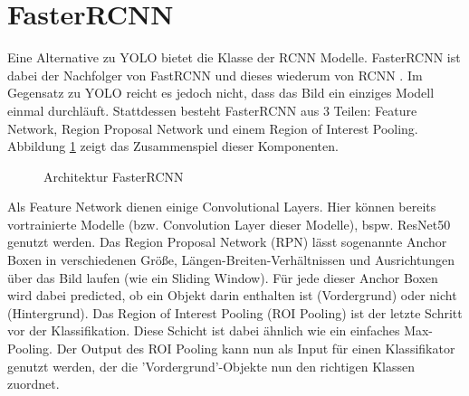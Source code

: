 \section{FasterRCNN}
Eine Alternative zu YOLO bietet die Klasse der RCNN Modelle.
FasterRCNN ist dabei der Nachfolger von FastRCNN und dieses wiederum von RCNN \cite{fasterrcnn}.
Im Gegensatz zu YOLO reicht es jedoch nicht, dass das Bild ein einziges Modell einmal durchläuft.
Stattdessen besteht FasterRCNN aus 3 Teilen: Feature Network, Region Proposal Network und einem Region of Interest Pooling. 
Abbildung \ref{fig:fasterrcnn} zeigt das Zusammenspiel dieser Komponenten. \\
\begin{figure}[!htb]
    \centering
    \caption{Architektur FasterRCNN \cite{fasterrcnn} }
    \label{fig:fasterrcnn}
\end{figure} 
Als Feature Network dienen einige Convolutional Layers. 
Hier können bereits vortrainierte Modelle (bzw. Convolution Layer dieser Modelle), bspw. ResNet50 genutzt werden.
Das Region Proposal Network (RPN) lässt sogenannte Anchor Boxen in verschiedenen Größe, Längen-Breiten-Verhältnissen und Ausrichtungen über das Bild laufen (wie ein Sliding Window).
Für jede dieser Anchor Boxen wird dabei predicted, ob ein Objekt darin enthalten ist (Vordergrund) oder nicht (Hintergrund).
Das Region of Interest Pooling (ROI Pooling) ist der letzte Schritt vor der Klassifikation.
Diese Schicht ist dabei ähnlich wie ein einfaches Max-Pooling.
Der Output des ROI Pooling kann nun als Input für einen Klassifikator genutzt werden, der die 'Vordergrund'-Objekte nun den richtigen Klassen zuordnet.\\

